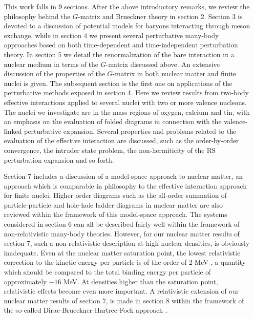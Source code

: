 This work falls in 9 sections. After the above introductory remarks, we
review the philosophy behind the $G$-matrix and Brueckner theory in section
2.
Section 3 is devoted to a discussion
of potential models for baryons interacting through meson exchange, while
in section 4 we present several perturbative many-body approaches
based on both time-dependent and time-independent perturbation
theory.
In section 5 we
detail the renormalization of the bare interaction
in a nuclear medium in terms of the $G$-matrix discussed above. An extensive
discussion of the properties of the $G$-matrix in both nuclear matter and
finite
nuclei is given. 
The subsequent section
is the first one on applications of the perturbative
methods exposed in section 4.
Here we review results from two-body effective
interactions applied to several nuclei with two or more valence nucleons.
The nuclei we investigate are in the mass regions of oxygen, calcium and tin,
with an emphasis on the evaluation
of folded diagrams in connection with the
valence-linked perturbative expansion.  Several properties and problems
related to the evaluation of the effective interaction are discussed,
such as the order-by-order convergence, the intruder state problem,
the non-hermiticity of the RS perturbation expansion and so forth.



Section 7 includes a discussion of a model-space approach to nuclear
matter, an approach which is comparable in philosophy to the
effective interaction approach for finite nuclei. Higher order
diagrams such as the all-order summation of particle-particle and
hole-hole ladder diagrams in nuclear matter are also reviewed within
the framework of this model-space approach. The systems considered
in section 6 can all be described fairly well within the framework
of non-relativistic many-body theories. However, for our nuclear
matter results of section 7, such a non-relativistic description
at high nuclear densities, is obviously inadequate. Even at the
nuclear matter saturation point, the lowest relativistic correction
to the kinetic energy per particle is of the order of $2$ MeV
\cite{kap88}, a
quantity which should be compared to the total binding energy
per particle of approximately $-16$ MeV. At densities higher than the
saturation point, relativistic effects become even more important.
A relativistic extension of our nuclear matter results of
section 7, is made  in section 8 within the framework
of the so-called Dirac-Brueckner-Hartree-Fock approach \cite{bm90,brook}.


